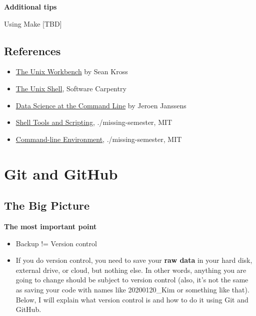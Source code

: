 \documentclass[
]{book}
\begin{document}
\textbf{Additional tips}

Using Make {[}TBD{]}

\subsection{References}\label{references}

\begin{itemize}
\item
  \href{https://seankross.com/the-unix-workbench/}{The Unix Workbench} by Sean Kross
\item
  \href{http://swcarpentry.GitHub.io/shell-novice/}{The Unix Shell}, Software Carpentry
\item
  \href{https://www.datascienceatthecommandline.com/1e/}{Data Science at the Command Line} by Jeroen Janssens
\end{itemize}

\begin{itemize}
\item
  \href{https://missing.csail.mit.edu/2020/shell-tools/}{Shell Tools and Scripting}, ./missing-semester, MIT
\item
  \href{https://missing.csail.mit.edu/2020/command-line/}{Command-line Environment}, ./missing-semester, MIT
\end{itemize}

\section{Git and GitHub}\label{git-and-github}

\subsection{The Big Picture}\label{the-big-picture-1}

\textbf{The most important point}

\begin{itemize}
\item
  Backup != Version control
\item
  If you do version control, you need to save your \textbf{raw data} in your hard disk, external drive, or cloud, but nothing else. In other words, anything you are going to change should be subject to version control (also, it's not the same as saving your code with names like 20200120\_Kim or something like that). Below, I will explain what version control is and how to do it using Git and GitHub.
\end{itemize}
\end{document}
